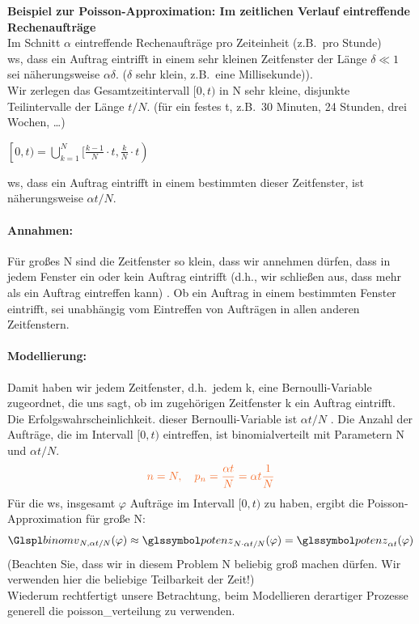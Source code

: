 \begin{bsp}
    \textbf{Beispiel zur Poisson-Approximation: Im zeitlichen Verlauf eintreffende Rechenaufträge}  \\
    Im Schnitt $\alpha$ eintreffende Rechenaufträge pro
    Zeiteinheit (z.B.\ pro Stunde) \\
    \gls{ws}, dass ein Auftrag eintrifft in einem sehr kleinen
    Zeitfenster der Länge $\delta \ll 1$ sei näherungsweise $\alpha \delta$.
    ($\delta$ sehr klein, z.B.\ eine Millisekunde)). \\
    Wir zerlegen das Gesamtzeitintervall $[0, t)$ in N sehr kleine, disjunkte
    Teilintervalle der Länge $t/N$.
    (für ein festes t, z.B.\ 30 Minuten, 24 Stunden, drei Wochen, \ldots)
   \begin{center}
       $\left[0, t) = \bigcup_{k=1}^N [\frac{k-1}{N} \cdot t, \frac{k}{N} \cdot t \right)$
   \end{center}
    \gls{ws}, dass ein Auftrag eintrifft in einem bestimmten dieser Zeitfenster, ist
    näherungsweise $\alpha t / N$.
    \paragraph{Annahmen:} Für großes N sind die Zeitfenster so klein, dass wir annehmen dürfen, dass in
    jedem Fenster ein oder kein Auftrag eintrifft (d.h., wir schließen aus, dass mehr als ein Auftrag eintreffen kann)
    .
    Ob ein Auftrag in einem bestimmten Fenster eintrifft, sei unabhängig vom
    Eintreffen von Aufträgen in allen anderen Zeitfenstern.
    \paragraph{Modellierung:} Damit haben wir jedem Zeitfenster, d.h.\ jedem k, eine \gls{Bernoulli-Variable}
    zugeordnet, die uns sagt, ob im zugehörigen Zeitfenster k ein Auftrag
    eintrifft.
    Die Erfolgswahrscheinlichkeit.
    dieser \gls{Bernoulli-Variable} ist $\alpha t / N$
    .
    Die Anzahl der Aufträge, die im Intervall $[0, t)$ eintreffen, ist binomialverteilt
    mit Parametern N und $\alpha t / N$.
    \[
        \txo{ n = N, \quad p_n = \frac{\alpha t}{N}  = \alpha t \frac{1}{N}}
    \]
    Für die \gls{ws}, insgesamt $\varphi$ Aufträge im Intervall $[0, t)$ zu haben, ergibt die
    Poisson-Approximation für große N:
    \[
        \Bnmv_{N, \alpha t / N}(\varphi) \approx \potm_{N \cdot \alpha t / N}(\varphi) = \potm_{\alpha t}(\varphi)
    \]
    (Beachten Sie, dass wir in diesem Problem N beliebig groß machen dürfen.
    Wir verwenden
    hier die beliebige Teilbarkeit der Zeit!) \\
    Wiederum rechtfertigt unsere Betrachtung, beim Modellieren derartiger Prozesse
    generell die \gls{poisson_verteilung} zu verwenden.
\end{bsp}

